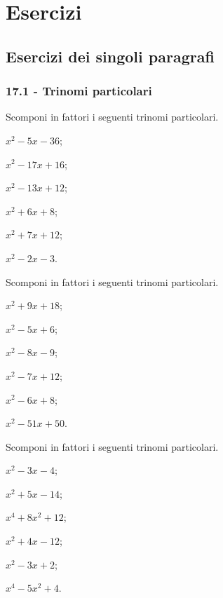 \section{Esercizi}
\subsection{Esercizi dei singoli paragrafi}
\subsubsection*{17.1 - Trinomi particolari}

\begin{esercizio}
 \label{ese:17.1}
 Scomponi in fattori i seguenti trinomi particolari.
 \begin{multicols}{3}
 \begin{enumeratea}
 \item $x^{2}-5x-36$;
 \item $x^{2}-17x+16$;
 \item $x^{2}-13x+12$;
 \item $x^{2}+6x+8$;
 \item $x^{2}+7x+12$;
 \item $x^{2}-2x-3$.
 \end{enumeratea}
\end{multicols}
\end{esercizio}

\begin{esercizio}
 \label{ese:17.2}
 Scomponi in fattori i seguenti trinomi particolari.
 \begin{multicols}{3}
 \begin{enumeratea}
 \item $x^{2}+9x+18$;
 \item $x^{2}-5x+6$;
 \item $x^{2}-8x-9$;
 \item $x^{2}-7x+12$;
 \item $x^{2}-6x+8$;
 \item $x^{2}-51x+50$.
 \end{enumeratea}
\end{multicols}
\end{esercizio}

\begin{esercizio}
 \label{ese:17.3}
 Scomponi in fattori i seguenti trinomi particolari.
 \begin{multicols}{3}
 \begin{enumeratea}
 \item $x^{2}-3x-4$;
 \item $x^{2}+5x-14$;
 \item $x^{4}+8x^{2}+12$;
 \item $x^{2}+4x-12$;
 \item $x^{2}-3x+2$;
 \item $x^{4}-5x^{2}+4$.
 \end{enumeratea}
\end{multicols}
\end{esercizio}

